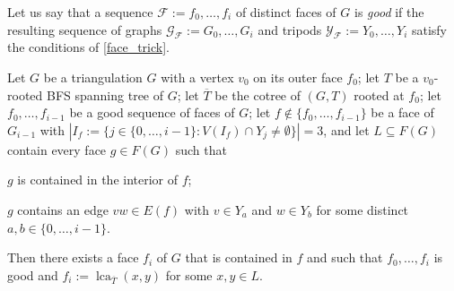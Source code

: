 \documentclass{patmorin}
\DeclareMathOperator{\lca}{lca}
\begin{document}
Let us say that a sequence $\mathcal{F}:=f_0,\ldots,f_i$ of distinct faces of $G$ is \emph{good} if the resulting sequence of graphs $\mathcal{G}_\mathcal{F}:=G_0,\ldots,G_i$ and tripods $\mathcal{Y}_\mathcal{F}:=Y_0,\ldots,Y_i$ satisfy the conditions of \cref{face_trick}.

\begin{lem}
  Let $G$ be a triangulation $G$ with a vertex $v_0$ on its outer face $f_0$; let $T$ be a $v_0$-rooted BFS spanning tree of $G$; let $\overline{T}$ be the cotree of $(G,T)$ rooted at $f_0$; let $f_0,\ldots,f_{i-1}$ be a good sequence of faces of $G$; let $f\not\in \{f_0,\ldots,f_{i-1}\}$ be a face of $G_{i-1}$ with $|I_f:=\{j\in\{0,\ldots,i-1\}:V(I_f)\cap Y_j\neq\emptyset\}|=3$, and let $L\subseteq F(G)$ contain every face $g\in F(G)$ such that
  \begin{compactenum}[(i)]
      \item $g$ is contained in the interior of $f$;
      \item $g$ contains an edge $vw\in E(f)$ with $v\in Y_a$ and $w\in Y_b$ for some distinct $a,b\in\{0,\ldots,i-1\}$.
  \end{compactenum}
  Then there exists a face $f_i$ of $G$ that is contained in $f$ and such that $f_0,\ldots,f_i$ is good and $f_i :=\lca_{\overline{T}}(x,y)$ for some $x,y\in L$.
\end{lem}
\end{document}
